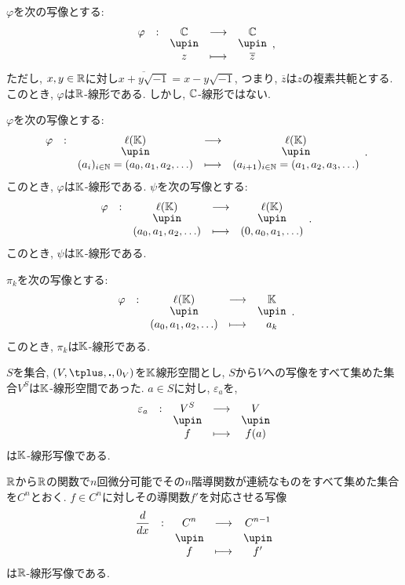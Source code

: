 \begin{example}
  $\varphi$を次の写像とする:
  \begin{align*}
    \shazo{\varphi}{\CC}{\CC}{z}{\overline{z}},
  \end{align*}
  ただし, 
  $x,y\in\mathbb{R}$に対し$\overline{x+y\sqrt{-1}}=x-y\sqrt{-1}$, つまり,
  $\overline{z}$は$z$の複素共軛とする.
  このとき, $\varphi$は$\mathbb{R}$-線形である.
  しかし, $\mathbb{C}$-線形ではない.
\end{example}


\begin{example}
  $\varphi$を次の写像とする:
  \begin{align*}
    \shazo{\varphi}{\ell(\KK)}{\ell(\KK)}
    {(a_i)_{i\in \NN}=(a_0,a_1,a_2,\ldots)}{(a_{i+1})_{i\in \NN}=(a_1,a_2,a_3,\ldots)}.
  \end{align*}
  このとき, $\varphi$は$\mathbb{K}$-線形である.
  $\psi$を次の写像とする:
  \begin{align*}
    \shazo{\varphi}{\ell(\KK)}{\ell(\KK)}
    {(a_0,a_1,a_2,\ldots)}{(0,a_0,a_1,\ldots)}.
  \end{align*}
  このとき, $\psi$は$\mathbb{K}$-線形である.
\end{example}

\begin{example}
  $\pi_k$を次の写像とする:
  \begin{align*}
    \shazo{\varphi}{\ell(\KK)}{\KK}
    {(a_0,a_1,a_2,\ldots)}{a_k}.
  \end{align*}
  このとき, $\pi_k$は$\mathbb{K}$-線形である.
\end{example}


\begin{example}
  $S$を集合,
  $(V,\plus,\act,0_V)$を$\mathbb{K}$線形空間とし,
  $S$から$V$への写像をすべて集めた集合$V^S$は$\mathbb{K}$-線形空間であった.
  $a\in S$に対し, $\varepsilon_a$を,
  \begin{align*}
  \shazo{\varepsilon_a}{V^S}{V}
  {f}{f(a)}
  \end{align*}
  は$\mathbb{K}$-線形写像である.
\end{example}

\begin{example}
$\mathbb{R}$から$\mathbb{R}$の関数で$n$回微分可能でその$n$階導関数が連続なものをすべて集めた集合を$C^n$とおく.
$f\in C^n$に対しその導関数$f'$を対応させる写像
  \begin{align*}
  \shazo{\frac{d}{dx}}{C^n}{C^{n-1}}
  {f}{f'}
  \end{align*}  
  は$\mathbb{R}$-線形写像である.
\end{example}


